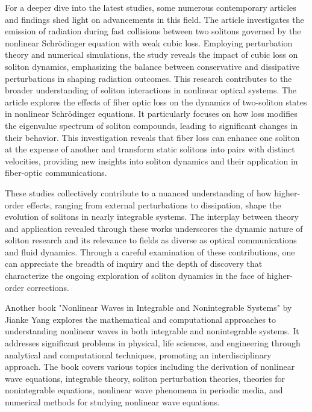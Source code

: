 For a deeper dive into the latest studies, some numerous contemporary articles and findings shed light on advancements in this field. The article \cite{peleg2020radiation} investigates the emission of radiation during fast collisions between two solitons governed by the nonlinear Schrödinger equation with weak cubic loss. Employing perturbation theory and numerical simulations, the study reveals the impact of cubic loss on soliton dynamics, emphasizing the balance between conservative and dissipative perturbations in shaping radiation outcomes. This research contributes to the broader understanding of soliton interactions in nonlinear optical systems. The article \cite{hause2018impact} explores the effects of fiber optic loss on the dynamics of two-soliton states in nonlinear Schrödinger equations. It particularly focuses on how loss modifies the eigenvalue spectrum of soliton compounds, leading to significant changes in their behavior. This investigation reveals that fiber loss can enhance one soliton at the expense of another and transform static solitons into pairs with distinct velocities, providing new insights into soliton dynamics and their application in fiber-optic communications.

These studies collectively contribute to a nuanced understanding of how higher-order effects, ranging from external perturbations to dissipation, shape the evolution of solitons in nearly integrable systems. The interplay between theory and application revealed through these works underscores the dynamic nature of soliton research and its relevance to fields as diverse as optical communications and fluid dynamics. Through a careful examination of these contributions, one can appreciate the breadth of inquiry and the depth of discovery that characterize the ongoing exploration of soliton dynamics in the face of higher-order corrections.

Another book "Nonlinear Waves in Integrable and Nonintegrable Systems" by Jianke Yang \cite{yang2010nonlinear} explores the mathematical and computational approaches to understanding nonlinear waves in both integrable and nonintegrable systems. It addresses significant problems in physical, life sciences, and engineering through analytical and computational techniques, promoting an interdisciplinary approach. The book covers various topics including the derivation of nonlinear wave equations, integrable theory, soliton perturbation theories, theories for nonintegrable equations, nonlinear wave phenomena in periodic media, and numerical methods for studying nonlinear wave equations.

